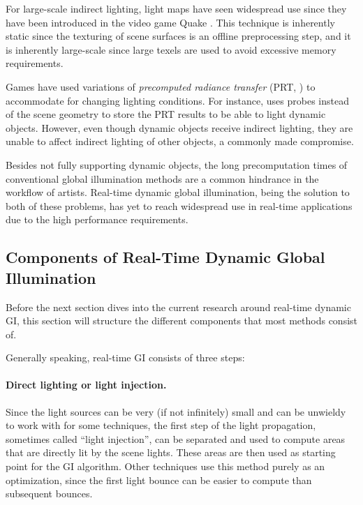 For large-scale indirect lighting, light maps have seen widespread use since they have been introduced in the video game Quake \citep{Abrash:1997:BlackBook}. This technique is inherently static since the texturing of scene surfaces is an offline preprocessing step, and it is inherently large-scale since large texels are used to avoid excessive memory requirements.

Games have used variations of \emph{precomputed radiance transfer} (PRT, \cite{sloan:2002:PRT}) to accommodate for changing lighting conditions. For instance, \citet{stefanov:2012:PRTinFarCry3} uses probes instead of the scene geometry to store the PRT results to be able to light dynamic objects. However, even though dynamic objects receive indirect lighting, they are unable to affect indirect lighting of other objects, a commonly made compromise.

Besides not fully supporting dynamic objects, the long precomputation times of conventional global illumination methods are a common hindrance in the workflow of artists. Real-time dynamic global illumination, being the solution to both of these problems, has yet to reach widespread use in real-time applications due to the high performance requirements.


\subsection{Components of Real-Time Dynamic Global Illumination}
\label{sec:intro:gi:components}

Before the next section dives into the current research around real-time dynamic GI, this section will structure the different components that most methods consist of.

Generally speaking, real-time GI consists of three steps:

\paragraph{Direct lighting or light injection.}
Since the light sources can be very (if not infinitely) small and can be unwieldy to work with for some techniques, the first step of the light propagation, sometimes called ``light injection'', can be separated and used to compute areas that are directly lit by the scene lights. These areas are then used as starting point for the GI algorithm. Other techniques use this method purely as an optimization, since the first light bounce can be easier to compute than subsequent bounces.

